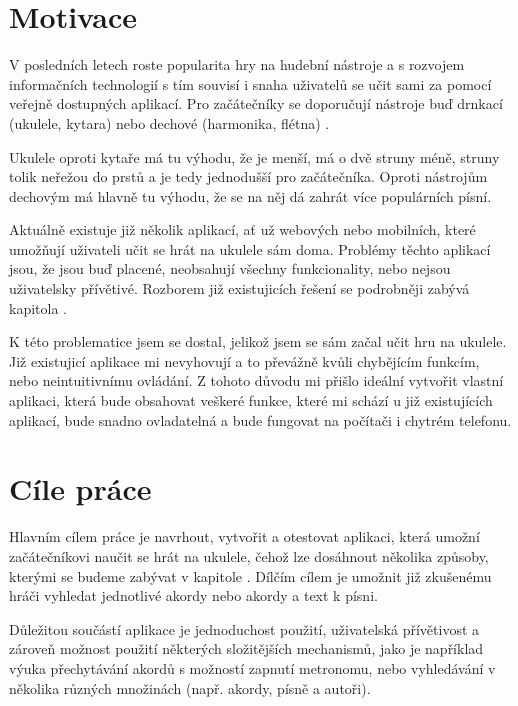 \begin{introduction}
    \label{ch:introduction}
    \section{Motivace}
    V posledních letech roste popularita hry na hudební nástroje a s rozvojem informačních technologií s tím souvisí i snaha uživatelů se učit sami za pomocí veřejně dostupných aplikací. Pro začátečníky se doporučují nástroje buď drnkací (ukulele, kytara) nebo dechové (harmonika, flétna)\cite{s_2016_the} \cite{richardson_2019_top}.

    Ukulele oproti kytaře má tu výhodu, že je menší, má o dvě struny méně, struny tolik neřežou do prstů a je tedy jednodušší pro začátečníka. Oproti nástrojům dechovým má hlavně tu výhodu, že se na něj dá zahrát více populárních písní.

    Aktuálně existuje již několik aplikací, ať už webových nebo mobilních, které umožňují uživateli učit se hrát na ukulele sám doma. Problémy těchto aplikací jsou, že jsou buď placené, neobsahují všechny funkcionality, nebo nejsou uživatelsky přívětivé. Rozborem již existujicích řešení se podrobněji zabývá kapitola .

    K této problematice jsem se dostal, jelikož jsem se sám začal učit hru na ukulele. Již existujicí aplikace mi nevyhovují a to převážně kvůli chybějícím funkcím, nebo neintuitivnímu ovládání. Z tohoto důvodu mi přišlo ideální vytvořit vlastní aplikaci, která bude obsahovat veškeré funkce, které mi schází u již existujících aplikací, bude snadno ovladatelná a bude fungovat na počítači i chytrém telefonu.


    \section{Cíle práce}
    Hlavním cílem práce je navrhout, vytvořit a otestovat aplikaci, která umožní začátečníkovi naučit se hrát na ukulele, čehož lze dosáhnout několika způsoby, kterými se budeme zabývat v kapitole . Dílčím cílem je umožnit již zkušenému hráči vyhledat jednotlivé akordy nebo akordy a text k písni.

    Důležitou součástí aplikace je jednoduchost použití, uživatelská přívětivost a zároveň možnost použití některých složitějších mechanismů, jako je například výuka přechytávání akordů s možností zapnutí metronomu, nebo vyhledávání v několika různých množinách (např. akordy, písně a autoři).


\end{introduction}
